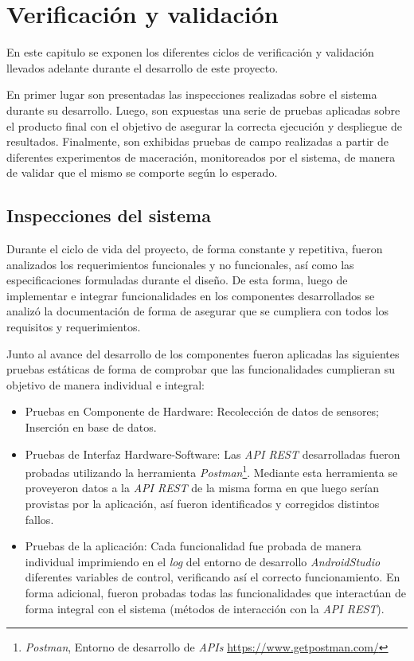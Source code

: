 \chapter{Verificación y validación}
\label{CapituloPruebas}
\par En este capitulo se exponen los diferentes ciclos de verificación y validación llevados adelante durante el desarrollo de este proyecto.
\par En primer lugar son presentadas las inspecciones realizadas sobre el sistema durante su desarrollo. Luego, son expuestas una serie de pruebas aplicadas sobre el producto final con el objetivo de asegurar la correcta ejecución y despliegue de resultados. Finalmente, son exhibidas pruebas de campo realizadas a partir de diferentes experimentos de maceración, monitoreados por el sistema, de manera de validar que el mismo se comporte según lo esperado.

\section{Inspecciones del sistema}

Durante el ciclo de vida del proyecto, de forma constante y repetitiva, fueron analizados los requerimientos funcionales y no funcionales, así como las especificaciones formuladas durante el diseño. De esta forma, luego de implementar e integrar funcionalidades en los componentes desarrollados se analizó la documentación de forma de asegurar que se cumpliera con todos los requisitos y requerimientos.
\par Junto al avance del desarrollo de los componentes fueron aplicadas las siguientes pruebas estáticas de forma de comprobar que las funcionalidades cumplieran su objetivo de manera individual e integral:
\begin{itemize}
    \item Pruebas en Componente de Hardware: Recolección de datos de sensores; Inserción en base de datos.
    \item Pruebas de Interfaz Hardware-Software: Las \textit{API REST} desarrolladas fueron probadas utilizando la herramienta \textit{Postman}\footnote{\textit{Postman}, Entorno de desarrollo de \textit{APIs} \url{https://www.getpostman.com/}}. Mediante esta herramienta se proveyeron datos a la \textit{API REST} de la misma forma en que luego serían provistas por la aplicación, así fueron identificados y corregidos distintos fallos.
    \item Pruebas de la aplicación: Cada funcionalidad fue probada de manera individual imprimiendo en el \textit{log} del entorno de desarrollo \textit{AndroidStudio} diferentes variables de control, verificando así el correcto funcionamiento. En forma adicional, fueron probadas todas las funcionalidades que interactúan de forma integral con el sistema (métodos de interacción con la \textit{API REST}).
\end{itemize}

